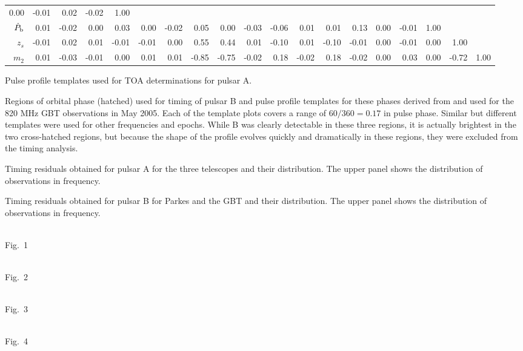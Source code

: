 \documentclass[12pt,psfig]{article}
\begin{document}
\begin{table}[ht]
\begin{center}
\begin{tabular}{r|rrrrrrrrrrrrrrrrrr}
       0.00& -0.01&  0.02& -0.02&  1.00& & & \\
 $\dot{P}_{\rm b}$&   0.01& -0.02 & 0.00 & 0.03 & 0.00& -0.02&  0.05 & 0.00& -0.03& -0.06&
       0.01&  0.01&  0.13&  0.00& -0.01&  1.00& & \\
 $z_s$&  -0.01 & 0.02 & 0.01& -0.01 &-0.01&  0.00 & 0.55&  0.44 & 0.01& -0.10&
       0.01& -0.10& -0.01&  0.00& -0.01&  0.00 & 1.00&   \\
   $m_2$&   0.01& -0.03& -0.01&  0.00&  0.01&  0.01& -0.85& -0.75& -0.02&  0.18& -0.02&  0.18& -0.02 & 0.00&  0.03&  0.00& -0.72&  1.00\\
\hline
\end{tabular}
\end{center}
\end{table}


\clearpage


\bigskip
{}
Pulse profile templates used for TOA determinations for pulsar A.

\bigskip
{}
Regions of orbital phase (hatched) used for timing of pulsar B and
  pulse profile templates for these phases derived from and used for
  the 820 MHz GBT observations in May 2005. Each of the template plots
  covers a range of $60/360=0.17$ in pulse phase. Similar but different
  templates were used for other frequencies and epochs.  While B was
  clearly detectable in these three regions, it is actually brightest
  in the two cross-hatched regions, but because the shape of the
  profile evolves quickly and dramatically in these regions, they were
  excluded from the timing analysis.

Timing residuals obtained for pulsar A 
for the three telescopes and their
distribution. The upper panel shows the distribution of
observations in frequency.

\bigskip
{}
Timing residuals obtained for pulsar B
for Parkes and the GBT and their
distribution. The upper panel shows the distribution of
observations in frequency. 



\clearpage
\centerline{\\Fig.~1}

\clearpage
\centerline{\\Fig.~2}

\clearpage
\centerline{\\Fig.~3}

\clearpage
\centerline{\\Fig.~4}
\end{document}
